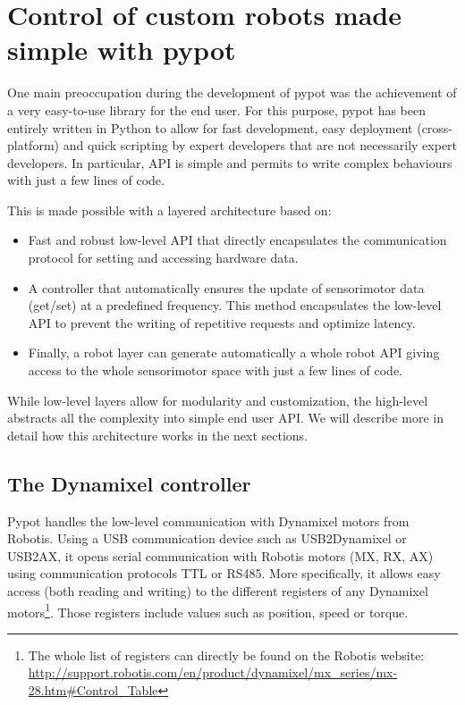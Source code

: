 \section{Control of custom robots made simple with pypot} %

One main preoccupation during the development of pypot was the achievement of a very easy-to-use library for the end user. For this purpose, pypot has been entirely written in Python to allow for fast development, easy deployment (cross-platform) and quick scripting by expert developers that are not necessarily expert developers. In particular, API is simple and permits to write complex behaviours with just a few lines of code.

This is made possible with a layered architecture based on:

\begin{itemize}
    \item Fast and robust low-level API that directly encapsulates the communication protocol for setting and accessing hardware data.
    \item A controller that automatically ensures the update of sensorimotor data (get/set) at a predefined frequency. This method encapsulates the low-level API to prevent the writing of repetitive requests and optimize latency.
    \item Finally, a robot layer can generate automatically a whole robot API giving access to the whole sensorimotor space with just a few lines of code.
\end{itemize}

While low-level layers allow for modularity and customization, the high-level abstracts all the complexity into simple end user API. We will describe more in detail how this architecture works in the next sections.


\subsection{The Dynamixel controller} %

Pypot handles the low-level communication with Dynamixel motors from Robotis. Using a USB communication device such as USB2Dynamixel or USB2AX, it opens serial communication with Robotis motors (MX, RX, AX) using communication protocols TTL or RS485. More specifically, it allows easy access (both reading and writing) to the different registers of any Dynamixel motors\footnote{The whole list of registers can directly be found on the Robotis website: \url{http://support.robotis.com/en/product/dynamixel/mx_series/mx-28.htm\#Control_Table}}. Those registers include values such as position, speed or torque.


